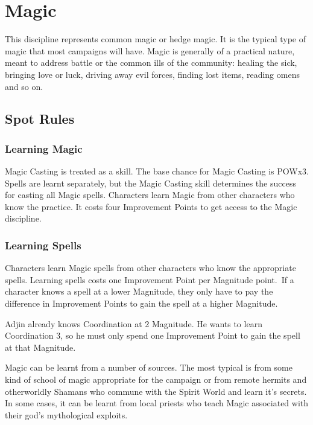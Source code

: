 \chapter{Magic}
\label{ch:magic}

This discipline represents common magic or hedge magic. It is the typical type of magic that most campaigns will have. Magic is generally of a practical nature, meant to address battle or the common ills of the community: healing the sick, bringing love or luck, driving away evil forces, finding lost items, reading omens and so on. 


\section{Spot Rules}

\subsection{Learning Magic}
Magic Casting is treated as a skill. The base chance for Magic Casting is POWx3. Spells are learnt separately, but the Magic Casting skill determines the success for casting all Magic spells. Characters learn Magic from other characters who know the practice. It costs four Improvement Points to get access to the Magic discipline.

\subsection{Learning Spells}
Characters learn Magic spells from other characters who know the appropriate spells. Learning spells costs one Improvement Point per Magnitude point. If a character knows a spell at a lower Magnitude, they only have to pay the difference in Improvement Points to gain the spell at a higher Magnitude.

\begin{rpg-examplebox}
Adjin already knows Coordination at 2 Magnitude. He wants to learn Coordination 3, so he must only spend one Improvement Point to gain the spell at that Magnitude.
\end{rpg-examplebox}


Magic can be learnt from a number of sources. The most typical is from some kind of school of magic appropriate for the campaign or from remote hermits and otherworldly Shamans who commune with the Spirit World and learn it's secrets. In some cases, it can be learnt from local priests who teach Magic associated with their god's mythological exploits.

